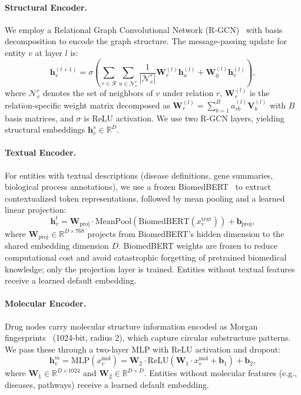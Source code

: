 \paragraph{Structural Encoder.}
We employ a Relational Graph Convolutional Network (R-GCN)~\citep{schlichtkrull2018modeling} with basis decomposition to encode the graph structure.
The message-passing update for entity $v$ at layer $l$ is:
\begin{equation}
    \mathbf{h}_v^{(l+1)} = \sigma \left( \sum_{r \in \mathcal{R}} \sum_{u \in \mathcal{N}_v^r} \frac{1}{|\mathcal{N}_v^r|} \mathbf{W}_r^{(l)} \mathbf{h}_u^{(l)} + \mathbf{W}_0^{(l)} \mathbf{h}_v^{(l)} \right),
    \label{eq:rgcn}
\end{equation}
where $\mathcal{N}_v^r$ denotes the set of neighbors of $v$ under relation $r$, $\mathbf{W}_r^{(l)}$ is the relation-specific weight matrix decomposed as $\mathbf{W}_r^{(l)} = \sum_{b=1}^{B} a_{rb}^{(l)} \mathbf{V}_b^{(l)}$ with $B$ basis matrices, and $\sigma$ is ReLU activation.
We use two R-GCN layers, yielding structural embeddings $\mathbf{h}_v^s \in \mathbb{R}^D$.

\paragraph{Textual Encoder.}
For entities with textual descriptions (disease definitions, gene summaries, biological process annotations), we use a frozen BiomedBERT~\citep{gu2021domain} to extract contextualized token representations, followed by mean pooling and a learned linear projection:
\begin{equation}
    \mathbf{h}_v^t = \mathbf{W}_{\text{proj}} \cdot \text{MeanPool}(\text{BiomedBERT}(x_v^{\text{text}})) + \mathbf{b}_{\text{proj}},
    \label{eq:text}
\end{equation}
where $\mathbf{W}_{\text{proj}} \in \mathbb{R}^{D \times 768}$ projects from BiomedBERT's hidden dimension to the shared embedding dimension $D$.
BiomedBERT weights are frozen to reduce computational cost and avoid catastrophic forgetting of pretrained biomedical knowledge; only the projection layer is trained.
Entities without textual features receive a learned default embedding.

\paragraph{Molecular Encoder.}
Drug nodes carry molecular structure information encoded as Morgan fingerprints~\citep{rogers2010extended} (1024-bit, radius 2), which capture circular substructure patterns.
We pass these through a two-layer MLP with ReLU activation and dropout:
\begin{equation}
    \mathbf{h}_v^m = \text{MLP}(x_v^{\text{mol}}) = \mathbf{W}_2 \cdot \text{ReLU}(\mathbf{W}_1 \cdot x_v^{\text{mol}} + \mathbf{b}_1) + \mathbf{b}_2,
    \label{eq:mol}
\end{equation}
where $\mathbf{W}_1 \in \mathbb{R}^{D \times 1024}$ and $\mathbf{W}_2 \in \mathbb{R}^{D \times D}$.
Entities without molecular features (e.g., diseases, pathways) receive a learned default embedding.

